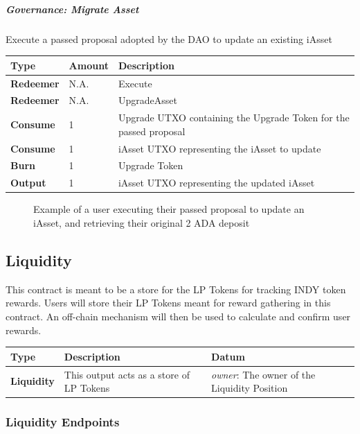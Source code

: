 \documentclass{article}
\begin{document}
\begin{sloppypar}
\hypertarget{governance-migrate-asset}{%
\subparagraph{Governance: Migrate
Asset}\label{governance-migrate-asset}}

Execute a passed proposal adopted by the DAO to update an existing
iAsset

\begin{tabularx}{\linewidth}{l|l|L}
\toprule
\textbf{Type} & \textbf{Amount} & \textbf{Description}
\tabularnewline
\midrule
\endhead
\textbf{Redeemer} & N.A. & Execute
\tabularnewline
\midrule
\textbf{Redeemer} & N.A. & UpgradeAsset
\tabularnewline
\midrule
\textbf{Consume} & 1 & Upgrade UTXO containing the Upgrade Token for the
passed proposal
\tabularnewline
\midrule
\textbf{Consume} & 1 & iAsset UTXO representing the iAsset to
update
\tabularnewline
\midrule
\textbf{Burn} & 1 & Upgrade Token
\tabularnewline
\midrule
\textbf{Output} & 1 & iAsset UTXO representing the updated
iAsset
\tabularnewline
\bottomrule
\end{tabularx}

\hypertarget{governance-execute-migrate-asset-figure}{%
\begin{figure}[htbp]
\centering

\caption{Example of a user executing their passed proposal to
update an iAsset, and retrieving their original 2 ADA deposit}
\label{governance-execute-migrate-asset-figure}
\end{figure}}

\hypertarget{liquidity}{%
\subsection{Liquidity}\label{liquidity}}

This contract is meant to be a store for the LP Tokens for tracking INDY
token rewards. Users will store their LP Tokens meant for reward
gathering in this contract. An off-chain mechanism will then be used to
calculate and confirm user rewards.

\begin{tabularx}{\linewidth}{l|L|L}
\caption{Liquidity outputs}
\tabularnewline
\toprule
\textbf{Type} & \textbf{Description} & \textbf{Datum}
\tabularnewline
\midrule
\endhead
\textbf{Liquidity} & This output acts as a store of LP Tokens &
\emph{owner}: The owner of the Liquidity Position
\tabularnewline
\bottomrule
\end{tabularx}

\hypertarget{liquidity-endpoints}{%
\subsubsection{Liquidity Endpoints}\label{liquidity-endpoints}}


\end{sloppypar}
\end{document}
